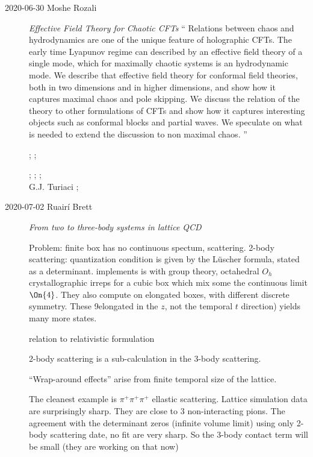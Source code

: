 \begin{description}
\item[2020-06-30 Moshe Rozali]
{\em Effective Field Theory for Chaotic CFTs}
``    
Relations between chaos and hydrodynamics are one of the unique feature
of holographic CFTs. The early time Lyapunov regime can described by an
effective field theory of a single mode, which for maximally chaotic
systems is an hydrodynamic mode. We describe that effective field theory
for conformal field theories, both in two dimensions and in higher
dimensions, and show how it captures maximal chaos and pole skipping. We
discuss the relation of the theory to other formulations of CFTs and show
how it captures interesting objects such as conformal blocks and partial
waves. We speculate on what is needed to extend the discussion to non
maximal chaos.
''

;
; %

;
;
;\\
G.J. Turiaci ;

\item[2020-07-02 Ruairí Brett]
{\em From two to three-body systems in lattice QCD}

Problem: finite box has no continuous spectum, scattering.
 2-body scattering: quantization condition is given by
the L\"uscher formula, stated as a determinant. 
implements is with group theory, octahedral $O_h$ crystallographic irreps
for a cubic box which mix some the continuous limit $\On{4}$. They also
compute on elongated boxes, with different discrete symmetry. These
9elongated in the $z$, not the temporal $t$ direction) yields many more
states.


relation to relativistic formulation

2-body scattering is a sub-calculation in the 3-body scattering.

``Wrap-around effects'' arise from finite temporal size of the lattice.

The cleanest example is $\pi^+\pi^+\pi^+$ ellastic scattering. Lattice
simulation data are surprisingly sharp. They are close to 3
non-interacting pions. The agreement with the determinant zeros (infinite
volume limit) using only 2-body scattering date, no fit are very sharp.
So the 3-body contact term will be small (they are working on that now)


\end{description}

